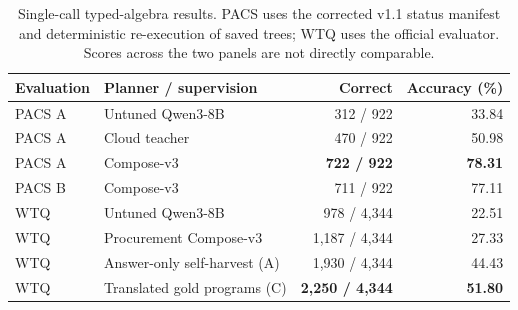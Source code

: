 \begin{table}[t]
  \centering
  \caption{Single-call typed-algebra results.  PACS uses the corrected v1.1 status manifest and
  deterministic re-execution of saved trees; WTQ uses the official evaluator.  Scores across the
  two panels are not directly comparable.}
  \label{tab:composition-transfer}
  \small
  \begin{tabular}{llrr}
    \toprule
    Evaluation & Planner / supervision & Correct & Accuracy (\%) \\
    \midrule
    PACS A & Untuned Qwen3-8B & 312 / 922 & 33.84 \\
    PACS A & Cloud teacher & 470 / 922 & 50.98 \\
    PACS A & Compose-v3 & \textbf{722 / 922} & \textbf{78.31} \\
    PACS B & Compose-v3 & 711 / 922 & 77.11 \\
    \midrule
    WTQ & Untuned Qwen3-8B & 978 / 4,344 & 22.51 \\
    WTQ & Procurement Compose-v3 & 1,187 / 4,344 & 27.33 \\
    WTQ & Answer-only self-harvest (A) & 1,930 / 4,344 & 44.43 \\
    WTQ & Translated gold programs (C) & \textbf{2,250 / 4,344} & \textbf{51.80} \\
    \bottomrule
  \end{tabular}
\end{table}
